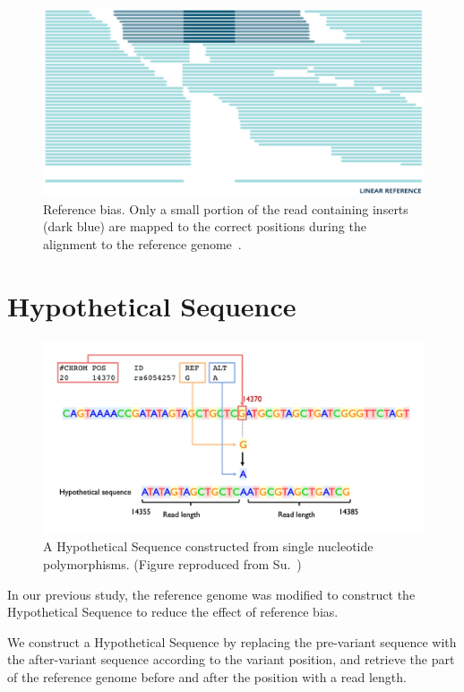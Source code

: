 \documentclass[PhD]{PHlab-thesis}
\begin{document}
\begin{figure}[h!]
	\centering
	\includegraphics[scale=0.25]{figures/Reference bias.png}
	\caption{Reference bias. Only a small portion of the read containing inserts (dark blue) are mapped to the correct positions during the alignment to the reference genome~\cite{Lau2017Refbias}.}
	\label{fig:Reference bias} %
\end{figure}

\section{Hypothetical Sequence}
\begin{figure}[h!]
	\centering
	\includegraphics[scale=0.25]{figures/Hypothetical Sequence.png}
	\caption{A Hypothetical Sequence constructed from single nucleotide polymorphisms. (Figure reproduced from Su.~\cite{Su2021RI})}
	\label{fig:Hypothetical Sequence} %
\end{figure}
In our previous study, the reference genome was modified to construct the Hypothetical Sequence to reduce the effect of reference bias.

We construct a Hypothetical Sequence by replacing the pre-variant sequence with the after-variant sequence according to the variant position, and retrieve the part of the reference genome before and after the position with a read length.
\end{document}
